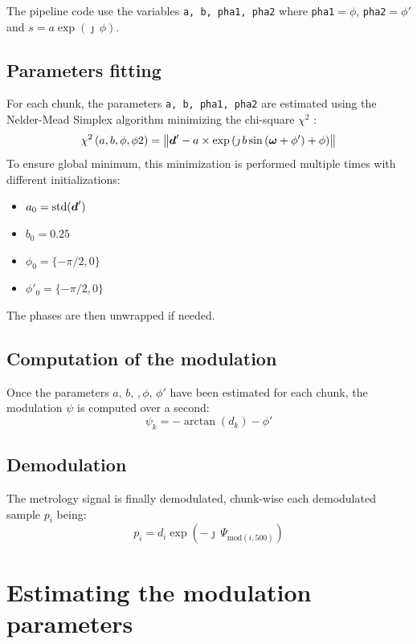 \documentclass[a4paper,11pt,twoside]{scrartcl}
\begin{document}
The pipeline code use the variables \verb+a, b, pha1, pha2+ where \verb|pha1|$=\phi$, \verb|pha2|$=\phi'$ and $s = a \exp(\jmath\,\phi)$.


\subsection{Parameters fitting}
For each chunk, the parameters \verb+a, b, pha1, pha2+ are estimated using the Nelder-Mead Simplex algorithm minimizing the chi-square $\chi^2$ :
\begin{equation}
    \chi^2 \left( a, b, \phi, \phi2 \right) =   \left\Vert \boldsymbol{d}' -  a \times  \exp\left( \jmath \, b \sin\left( \boldsymbol{\omega} + \phi' \right) + \phi \right)\right\Vert
\end{equation}
To ensure global minimum, this minimization is performed multiple times with different initializations:
\begin{itemize}
    \item $a_0 = \mathrm{std}(\boldsymbol{d}')$
    \item $b_0 = 0.25$
    \item $\phi_0 = \{-\pi/2, 0\} $
    \item $\phi'_0 = \{-\pi/2, 0\} $
\end{itemize}
The phases are then unwrapped if needed.

\subsection{Computation of the modulation}
Once the parameters $a,\,b,\,,\phi,\,\phi'$ have been estimated for each chunk, the modulation $\psi$ is computed over a second:
\begin{equation}
   \psi_k =  -\arctan(d_k) - \phi'
\end{equation}

\subsection{Demodulation}
The metrology signal is finally demodulated, chunk-wise each demodulated sample $p_i$  being:
\begin{equation}
   p_i = d_i  \exp\left(- \jmath \,\Psi_{\textrm{mod}(i,500)} \right) 
\end{equation}


\section{ Estimating the modulation parameters}
\end{document}

